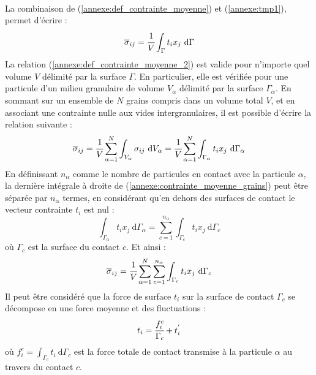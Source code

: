 \paragraph{}
La combinaison de (\ref{annexe:def_contrainte_moyenne}) et (\ref{annexe:tmp1}), permet d'écrire :
\begin{equation}\label{annexe:def_contrainte_moyenne_2}
	\overline{\sigma}_{ij}
	= \cfrac{1}{V} \int_\Gamma t_i x_j\ \mathrm{d}\Gamma
\end{equation}
La relation (\ref{annexe:def_contrainte_moyenne_2}) est valide pour n'importe quel volume $V$ délimité par la surface $\Gamma$. En particulier, elle est vérifiée pour une particule d'un milieu granulaire de volume $V_\alpha$ délimité par la surface $\Gamma_\alpha$. En sommant sur un ensemble de $N$ grains compris dans un volume total $V$, et en associant une contrainte nulle aux vides intergranulaires, il est possible d'écrire la relation suivante :
\begin{equation}\label{annexe:contrainte_moyenne_grains}
	\overline{\sigma}_{ij}
	= \cfrac{1}{V} \sum_{\alpha=1}^{N} \int_{V_\alpha} \sigma_{ij}\ \mathrm{d}V_\alpha
	= \cfrac{1}{V} \sum_{\alpha=1}^{N} \int_{\Gamma_\alpha} t_i x_j\ \mathrm{d}\Gamma_\alpha
\end{equation}
En définissant $n_\alpha$ comme le nombre de particules en contact avec la particule $\alpha$, la dernière intégrale à droite de (\ref{annexe:contrainte_moyenne_grains}) peut être séparée par $n_\alpha$ termes, en considérant qu'en dehors des surfaces de contact le vecteur contrainte $t_i$ est nul :
\begin{equation}
	\int_{\Gamma_\alpha} t_i x_j\ \mathrm{d}\Gamma_\alpha
	= \sum_{c=1}^{n_\alpha} \int_{\Gamma_c} t_i x_j\ \mathrm{d}\Gamma_c
\end{equation}
où $\Gamma_c$ est la surface du contact $c$. Et ainsi :
\begin{equation}\label{annexe:contraintes_contacts}
	\overline{\sigma}_{ij}
	= \cfrac{1}{V} \sum_{\alpha=1}^{N} \sum_{c=1}^{n_\alpha} \int_{\Gamma_c} t_i x_j\ \mathrm{d}\Gamma_c
\end{equation}
Il peut être considéré que la force de surface $t_i$ sur la surface de contact $\Gamma_c$ se décompose en une force moyenne et des fluctuations :
\begin{equation}\label{annexe:decomposition_force_surface}
	t_i
	= \cfrac{f_i^c}{\Gamma_c} + t_i^{'}
\end{equation}
où $f_i^c = \int_{\Gamma_c} t_i\ \mathrm{d}\Gamma_c$ est la force totale de contact transmise à la particule $\alpha$ au travers du contact $c$.
